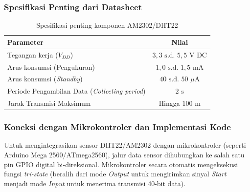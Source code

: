 \subsubsection{Spesifikasi Penting dari Datasheet}

\begin{table}[H]
	\centering
	\caption{Spesifikasi penting komponen AM2302/DHT22}
	\label{tab:dht22_spesifikasi}
	\small
	\begin{tabularx}{\textwidth}{@{}Xc@{}} %
		\toprule
		Parameter                                             & Nilai                          \\
		\midrule
		Tegangan kerja ($V_{DD}$)                             & $3{,}3 \text{ s.d. } 5{,}5$ $\text{V DC}$ \\
		Arus konsumsi (Pengukuran)                            & $1{,}0 \text{ s.d. } 1{,}5$ $\text{mA}$   \\
		Arus konsumsi (\textit{Standby})                      & $40 \text{ s.d. } 50$ $\mu\text{A}$ \\
		Periode Pengambilan Data (\textit{Collecting period}) & $2$ $\text{s}$    \\
		Jarak Transmisi Maksimum                              & Hingga $100$ $\text{m}$    \\
		\bottomrule
	\end{tabularx}
\end{table}


\subsubsection{Koneksi dengan Mikrokontroler dan Implementasi Kode}

Untuk mengintegrasikan sensor DHT22/AM2302 dengan mikrokontroler (seperti Arduino Mega 2560/ATmega2560), jalur data sensor dihubungkan ke salah satu pin GPIO digital bi-direksional. Mikrokontroler secara otomatis mengeksekusi fungsi \textit{tri-state} (beralih dari mode \textit{Output} untuk mengirimkan sinyal \textit{Start} menjadi mode \textit{Input} untuk menerima transmisi 40-bit data).

